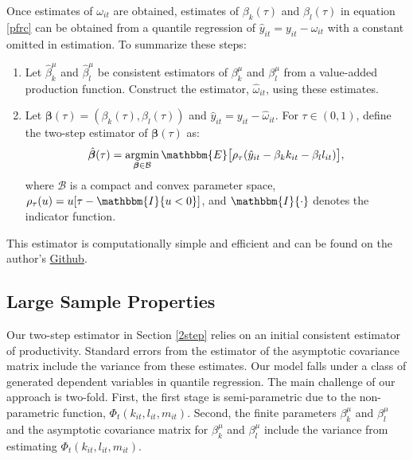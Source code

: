 \documentclass[12pt]{article}
\begin{document}
Once estimates of $\omega_{it}$ are obtained, estimates of $\beta_{k}(\tau)$ and $\beta_{l}(\tau)$ in equation \eqref{pfrc}
can be obtained from a quantile regression of $\hat{y}_{it}=y_{it}-\hat{\omega}_{it}$ with a constant omitted in estimation. To summarize these steps:
\begin{enumerate}
	\item Let $\hat{\beta}_{k}^{\mu}$ and $\hat{\beta}_{l}^{\mu}$ be consistent estimators of $\beta_{k}^{\mu}$ and $\beta_{l}^{\mu}$ from a value-added production function. Construct the estimator, $\hat{\omega}_{it}$, using these estimates.
	\item Let $\boldsymbol{\beta}(\tau)=(\beta_{k}(\tau), \beta_{l}(\tau))$ and $\hat{y}_{it}=y_{it}-\hat{\omega}_{it}$. For $\tau \in (0, 1)$, define the two-step estimator of $\boldsymbol{\beta}(\tau)$ as:
	\begin{equation*}
	\hat{\boldsymbol{\beta}}(\tau)=\underset{\boldsymbol{\beta}\in\mathcal{B}}{\operatorname{argmin}}\, \mathbbm{E}\big[\rho_{\tau}(\hat{y}_{it}-\beta_{k}k_{it}-\beta_{l}l_{it})\big],
	\end{equation*}
	where $\mathcal{B}$ is a compact and convex parameter space, $\rho_{\tau}(u)=u[\tau-\mathbbm{I}\{u<0\}]$, and $\mathbbm{I}\{\cdot\}$ denotes the indicator function.
\end{enumerate}
This estimator is computationally simple and efficient and can be found on the author's \href{https://github.com/justdoty/Quantile-Production-Functions}{Github}.
\subsection{Large Sample Properties} \label{asymptotics}
Our two-step estimator in Section \ref{2step} relies on an initial consistent estimator of productivity.  Standard errors from the estimator of the asymptotic covariance matrix include the variance from these estimates. Our model falls under a class of generated dependent variables in quantile regression. The main challenge of our approach is two-fold. First, the first stage is semi-parametric due to the non-parametric function, $\Phi_{t}(k_{it}, l_{it}, m_{it})$. Second, the finite parameters $\beta_{k}^{\mu}$ and $\beta_{l}^{\mu}$ and the asymptotic covariance matrix for $\beta_{k}^{\mu}$ and $\beta_{l}^{\mu}$ include the variance from estimating $\Phi_{t}(k_{it}, l_{it}, m_{it})$.
\end{document}
